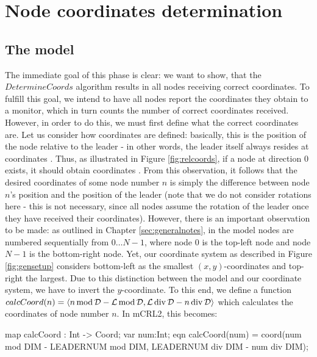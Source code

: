 \chapter{Node coordinates determination}

\section{The model}
\label{model:coords}

The immediate goal of this phase is clear: we want to show, that the $DetermineCoords$ algorithm results in all nodes receiving correct coordinates. To fulfill this goal, we intend to have all nodes report the coordinates they obtain to a monitor, which in turn counts the number of correct coordinates received. However, in order to do this, we must first define what the correct coordinates are. Let us consider how coordinates are defined: basically, this is the position of the node relative to the leader - in other words, the leader itself always resides at coordinates . Thus, as illustrated in Figure \ref{fig:relcoords}, if a node at direction $0$ exists, it should obtain coordinates . From this observation, it follows that the desired coordinates of some node number $n$ is simply the difference between node $n$'s position and the position of the leader (note that we do not consider rotations here - this is not necessary, since all nodes assume the rotation of the leader once they have received their coordinates). However, there is an important observation to be made: as outlined in Chapter \ref{sec:generalnotes}, in the model nodes are numbered sequentially from $0 \dots N - 1$, where node $0$ is the top-left node and node $N - 1$ is the bottom-right node. Yet, our coordinate system as described in Figure \ref{fig:gensetup} considers bottom-left as the smallest $(x,y)$-coordinates and top-right the largest. Due to this distinction between the model and our coordinate system, we have to invert the $y$-coordinate. To this end, we define a function $calcCoord(n) = \langle n \operatorname{mod} \mathcal{D} - \mathcal{L} \operatorname{mod} \mathcal{D}, \mathcal{L} \operatorname{div} \mathcal{D} - n \operatorname{div} \mathcal{D} \rangle$ which calculates the coordinates of node number $n$. In mCRL2, this becomes:

\begin{codeverb}
map     calcCoord : Int -> Coord;
var     num:Int;
eqn     calcCoord(num) =
                  coord(num mod DIM - LEADERNUM mod DIM,
                        LEADERNUM div DIM - num div DIM);
\end{codeverb}

